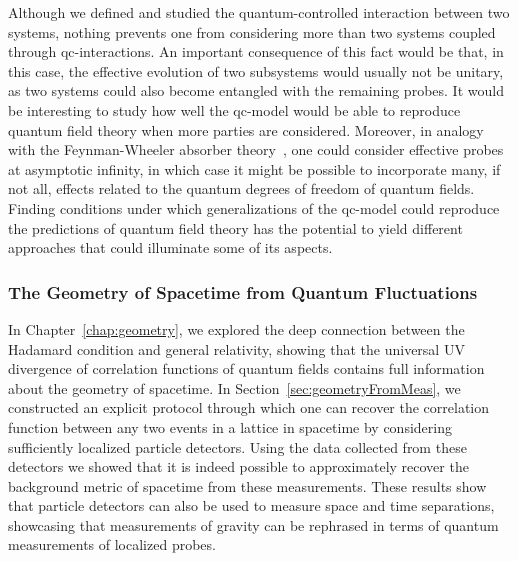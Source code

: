 \documentclass[letterpaper,12pt,titlepage,oneside,final]{book}
\begin{document}
Although we defined and studied the quantum-controlled interaction between two systems, nothing prevents one from considering more than two systems coupled through qc-interactions. An important consequence of this fact would be that, in this case, the effective evolution of two subsystems would usually not be unitary, as two systems could also become entangled with the remaining probes. It would be interesting to study how well the qc-model would be able to reproduce quantum field theory when more parties are considered. Moreover, in analogy with the Feynman-Wheeler absorber theory~\cite{Wheeler:1945ps,Wheeler:1949hn}, one could consider effective probes at asymptotic infinity, in which case it might be possible to incorporate many, if not all, effects related to the quantum degrees of freedom of quantum fields. Finding conditions under which generalizations of the qc-model could reproduce the predictions of quantum field theory has the potential to yield different approaches that could illuminate some of its aspects.



\subsubsection*{The Geometry of Spacetime from Quantum Fluctuations}

In Chapter~\ref{chap:geometry}, we explored the deep connection between the Hadamard condition and general relativity, showing that the universal UV divergence of correlation functions of quantum fields contains full information about the geometry of spacetime. In Section~\ref{sec:geometryFromMeas}, we constructed an explicit protocol through which one can recover the correlation function between any two events in a lattice in spacetime by considering sufficiently localized particle detectors. Using the data collected from these detectors we showed that it is indeed possible to approximately recover the background metric of spacetime from these measurements. These results show that particle detectors can also be used to measure space and time separations, showcasing that measurements of gravity can be rephrased in terms of quantum measurements of localized probes.
\end{document}
